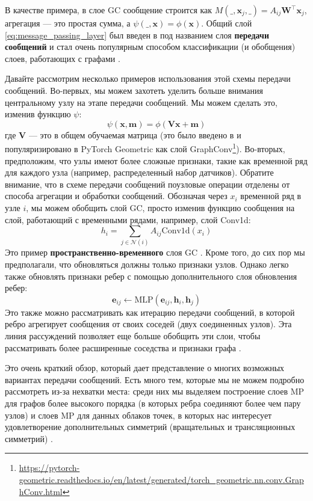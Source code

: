 В качестве примера, в слое GC сообщение строится как $M(\_, \mathbf{x}_j, \_)=A_{ij}\mathbf{W}^\top\mathbf{x}_j$, агрегация — это простая сумма, а $\psi(\_, \mathbf{x})=\phi(\mathbf{x})$. Общий слой \eqref{eq:message_passing_layer} был введен в \cite{gilmer2017neural} под названием слоя \textbf{передачи сообщений} и стал очень популярным способом классификации (и обобщения) слоев, работающих с графами \cite{velivckovic2022message}.

Давайте рассмотрим несколько примеров использования этой схемы передачи сообщений. Во-первых, мы можем захотеть уделить больше внимания центральному узлу на этапе передачи сообщений. Мы можем сделать это, изменив функцию $\psi$:
%
$$
\psi(\mathbf{x}, \mathbf{m})=\phi(\mathbf{V}\mathbf{x}+\mathbf{m})
$$
%
где $\mathbf{V}$ — это в общем обучаемая матрица (это было введено в \cite{morris2019weisfeiler} и популяризировано в PyTorch Geometric как слой GraphConv\footnote{\url{https://pytorch-geometric.readthedocs.io/en/latest/generated/torch_geometric.nn.conv.GraphConv.html}}). Во-вторых, предположим, что узлы имеют более сложные признаки, такие как временной ряд для каждого узла (например, распределенный набор датчиков). Обратите внимание, что в схеме передачи сообщений поузловые операции отделены от способа агрегации и обработки сообщений. Обозначая через $x_i$ временной ряд в узле $i$, мы можем обобщить слой GC, просто изменив функцию сообщения на слой, работающий с временными рядами, например, слой Conv1d:
%
$$
h_i=\sum_{j \in \mathcal{N}(i)} A_{ij} \text{Conv1d}(x_i)
$$
%
Это пример \textbf{пространственно-временного} слоя GC \cite{yu2017spatio}. Кроме того, до сих пор мы предполагали, что обновляться должны только признаки узлов. Однако легко также обновлять признаки ребер с помощью дополнительного слоя обновления ребер:
%
$$
\mathbf{e}_{ij} \leftarrow\text{MLP}(\mathbf{e}_{ij},\mathbf{h}_i, \mathbf{h}_j)
$$
%
Это также можно рассматривать как итерацию передачи сообщений, в которой ребро агрегирует сообщения от своих соседей (двух соединенных узлов). Эта линия рассуждений позволяет еще больше обобщить эти слои, чтобы рассматривать более расширенные соседства и признаки графа \cite{battaglia2018relational}.

Это очень краткий обзор, который дает представление о многих возможных вариантах передачи сообщений. Есть много тем, которые мы не можем подробно рассмотреть из-за нехватки места: среди них мы выделяем построение слоев MP для графов более высокого порядка (в которых ребра соединяют более чем пару узлов) \cite{chien2021you} и слоев MP для данных облаков точек, в которых нас интересует удовлетворение дополнительных симметрий (вращательных и трансляционных симметрий) \cite{satorras2021n,eijkelboom2023n}.

